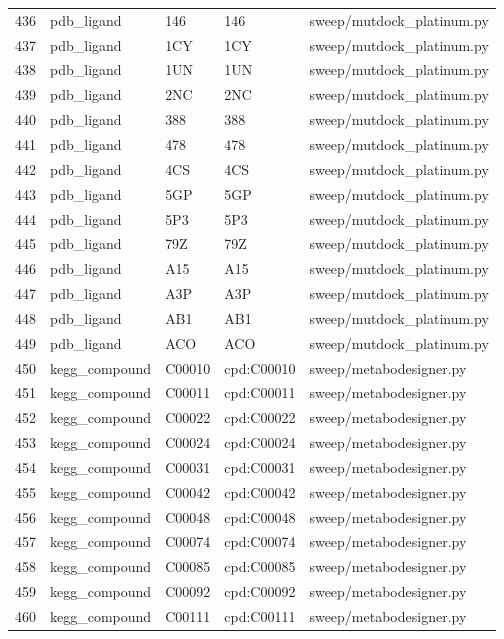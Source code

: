 {\begin{longtable}{rllp{3.2cm}p{4.2cm}}
436 & pdb\_ligand & 146 & 146 & sweep/mutdock\_platinum.py\\
437 & pdb\_ligand & 1CY & 1CY & sweep/mutdock\_platinum.py\\
438 & pdb\_ligand & 1UN & 1UN & sweep/mutdock\_platinum.py\\
439 & pdb\_ligand & 2NC & 2NC & sweep/mutdock\_platinum.py\\
440 & pdb\_ligand & 388 & 388 & sweep/mutdock\_platinum.py\\
441 & pdb\_ligand & 478 & 478 & sweep/mutdock\_platinum.py\\
442 & pdb\_ligand & 4CS & 4CS & sweep/mutdock\_platinum.py\\
443 & pdb\_ligand & 5GP & 5GP & sweep/mutdock\_platinum.py\\
444 & pdb\_ligand & 5P3 & 5P3 & sweep/mutdock\_platinum.py\\
445 & pdb\_ligand & 79Z & 79Z & sweep/mutdock\_platinum.py\\
446 & pdb\_ligand & A15 & A15 & sweep/mutdock\_platinum.py\\
447 & pdb\_ligand & A3P & A3P & sweep/mutdock\_platinum.py\\
448 & pdb\_ligand & AB1 & AB1 & sweep/mutdock\_platinum.py\\
449 & pdb\_ligand & ACO & ACO & sweep/mutdock\_platinum.py\\
450 & kegg\_compound & C00010 & cpd:C00010 & sweep/metabodesigner.py\\
451 & kegg\_compound & C00011 & cpd:C00011 & sweep/metabodesigner.py\\
452 & kegg\_compound & C00022 & cpd:C00022 & sweep/metabodesigner.py\\
453 & kegg\_compound & C00024 & cpd:C00024 & sweep/metabodesigner.py\\
454 & kegg\_compound & C00031 & cpd:C00031 & sweep/metabodesigner.py\\
455 & kegg\_compound & C00042 & cpd:C00042 & sweep/metabodesigner.py\\
456 & kegg\_compound & C00048 & cpd:C00048 & sweep/metabodesigner.py\\
457 & kegg\_compound & C00074 & cpd:C00074 & sweep/metabodesigner.py\\
458 & kegg\_compound & C00085 & cpd:C00085 & sweep/metabodesigner.py\\
459 & kegg\_compound & C00092 & cpd:C00092 & sweep/metabodesigner.py\\
460 & kegg\_compound & C00111 & cpd:C00111 & sweep/metabodesigner.py\\

\end{longtable}}
